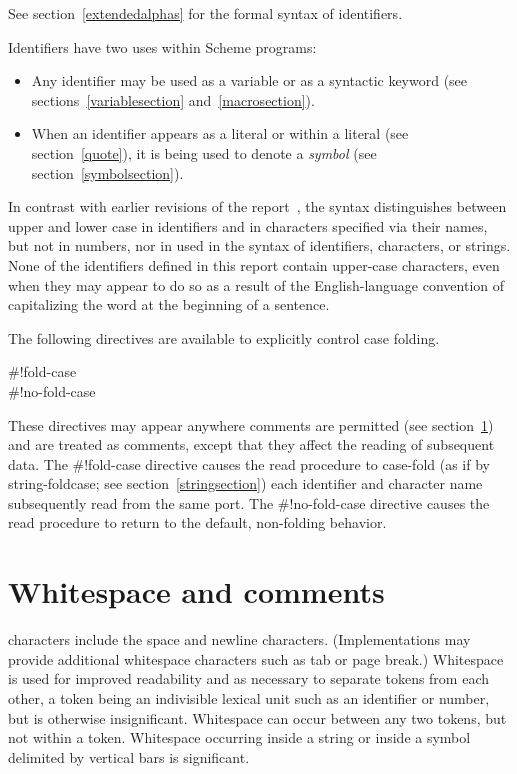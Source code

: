 See section~\ref{extendedalphas} for the formal syntax of identifiers.

\vest Identifiers have two uses within Scheme programs:
\begin{itemize}
\item Any identifier may be used as a variable
 or as a syntactic keyword
(see sections~\ref{variablesection} and~\ref{macrosection}).

\item When an identifier appears as a literal or within a literal
(see section~\ref{quote}), it is being used to denote a {\em symbol}
(see section~\ref{symbolsection}).
\end{itemize}

In contrast with earlier revisions of the report~\cite{R5RS}, the
syntax distinguishes between upper and lower case in
identifiers and in characters specified via their names,
but not in numbers,
nor in  used
in the syntax of identifiers, characters, or strings.
None of the identifiers defined in this report contain upper-case
characters, even when they may appear to do so as a result
of the English-language convention of capitalizing the word at
the beginning of a sentence.

The following directives are available to explicitly control case
folding.

\begin{entry}{%
{\cf{}\#!fold-case}\\
{\cf{}\#!no-fold-case}}

These directives may appear anywhere comments are permitted (see
section~\ref{wscommentsection})
and are treated as comments, except that they affect the reading
of subsequent data. The {\cf{}\#!fold-case} directive causes
the {\cf read} procedure to case-fold (as if by {\cf string-foldcase};
see section~\ref{stringsection}) each identifier and character name
subsequently read from the same port. The {\cf{}\#!no-fold-case} directive
causes the {\cf read} procedure to return to the default, non-folding behavior.
\end{entry}



\section{Whitespace and comments}
\label{wscommentsection}

 characters include the space and newline characters.
(Implementations may provide additional whitespace characters such
as tab or page break.)  Whitespace is used for improved readability and
as necessary to separate tokens from each other, a token being an
indivisible lexical unit such as an identifier or number, but is
otherwise insignificant.  Whitespace can occur between any two tokens,
but not within a token.  Whitespace occurring inside a string
or inside a symbol delimited by vertical bars
is significant.

